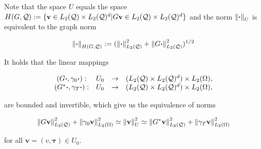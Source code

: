 Note that the space $U$ equals the space $H(G,\mathcal{Q}):=\{\mathbf{v}\in L_2(\mathcal{Q})\times L_2(\mathcal{Q})^d|G\mathbf{v}\in L_2(\mathcal{Q})\times L_2(\mathcal{Q})^d\}$ and the norm $\left\lVert\boldsymbol{\cdot} \right\rVert_U$ is equivalent to the graph norm 

$$\left\lVert\boldsymbol{\cdot} \right\rVert_{H(G,\mathcal{Q})}:=(\left\lVert\boldsymbol{\cdot} \right\rVert_{L_2(\mathcal{Q})}^2+\left\lVert G\boldsymbol{\cdot} \right\rVert_{L_2(\mathcal{Q})}^2)^{1/2}$$

\begin{teor} \label{InvMapping}
    It holds that the linear mappings

    $$\begin{matrix}
        (G\boldsymbol{\cdot},\gamma_0\boldsymbol{\cdot}):&U_0&\to&(L_2(\mathcal{Q})\times L_2(\mathcal{Q})^d)\times L_2(\Omega),\\
        (G^*\boldsymbol{\cdot},\gamma_T\boldsymbol{\cdot}):&U_0&\to&(L_2(\mathcal{Q})\times L_2(\mathcal{Q})^d)\times L_2(\Omega),
    \end{matrix}$$

    are bounded and invertible, which give us the equivalence of norms

    $$\left\lVert G\mathbf{v} \right\rVert_{L_2(\mathcal{Q})}^2+\left\lVert\gamma_0\mathbf{v} \right\rVert_{L_2(\Omega)}^2\simeq \left\lVert\mathbf{v} \right\rVert_U^2\simeq\left\lVert G^*\mathbf{v} \right\rVert_{L_2(\mathcal{Q})}^2+\left\lVert\gamma_T\mathbf{v} \right\rVert_{L_2(\Omega)}^2$$

    for all $\mathbf{v}=(v,\boldsymbol{\tau})\in U_0$.
\end{teor}

